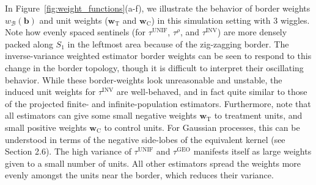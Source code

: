 \documentclass[letter,12pt]{article}
\newcommand{\treat}{\mathrm{T}}
\newcommand{\ctrol}{\mathrm{C}}
\newcommand{\wvec}{\mathbold{w}}
\newcommand{\border}{\mathcal{B}}
\newcommand{\sentinel}{\bm{b}}
\newcommand{\unifavg}{\tau^{\mathrm{UNIF}}}
\newcommand{\invvar}{\tau^{\mathrm{INV}}}
\newcommand{\taurho}{\tau^{\rho}}
\newcommand{\taugeo}{\tau^{\mathrm{GEO}}}
\newcommand{\weightb}{w_{\border}}
\newcommand{\wt}{\wvec_{\treat}}
\newcommand{\wc}{\wvec_{\ctrol}}
\begin{document}
        In Figure~\ref{fig:weight_functions}(a-f), we illustrate the behavior of border weights \(\weightb(\sentinel)\) and unit weights (\(\wt\) and \(\wc\)) in this simulation setting with 3 wiggles.
Note how evenly spaced sentinels (for \(\unifavg\), \(\taurho\), and \(\invvar\)) are more densely packed along \(S_1\) in the leftmost area because of the zig-zagging border.
The inverse-variance weighted estimator border weights can be seen to respond to this change in the border topology, though it is difficult to interpret their oscillating behavior.
While these border-weights look unreasonable and unstable, the induced unit weights for \(\invvar\) are well-behaved, and in fact quite similar to those of the projected finite- and infinite-population estimators.
Furthermore, note that all estimators can give some small negative weights \(\wt\) to treatment units, and small positive weights \(\wc\) to control units.
For Gaussian processes, this can be understood in terms of the negative side-lobes of the equivalent kernel (see \cite{rasmussen2006gaussian} Section 2.6).
The high variance of \(\unifavg\) and \(\taugeo\) manifests itself as large weights given to a small number of units.
All other estimators spread the weights more evenly amongst the units near the border, which reduces their variance.
    
\end{document}
